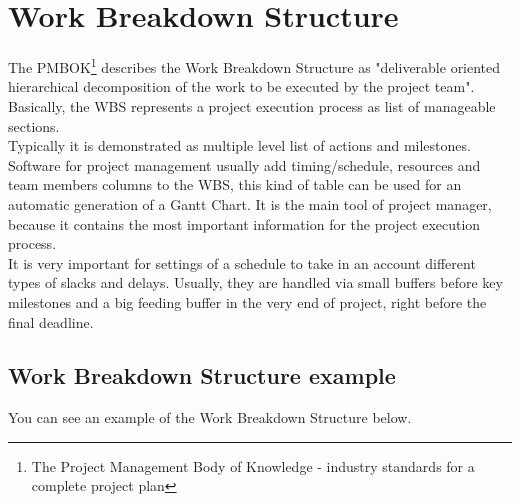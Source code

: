 \documentclass[english]{article}
\begin{document}
\section{Work Breakdown Structure}

The PMBOK\footnote{The Project Management Body of Knowledge - industry standards for a complete project plan} describes the Work Breakdown Structure as "deliverable oriented hierarchical decomposition of the work to be executed by the project team". Basically, the WBS represents a project execution process as list of manageable sections.\\

Typically it is demonstrated as multiple level list of actions and milestones. Software for project management usually add timing/schedule, resources and team members columns to the WBS, this kind of table can be used for an automatic generation of a Gantt Chart. It is the main tool of project manager, because it contains the most important information for the project execution process.\cite{ms}\\

It is very important for settings of a schedule to take in an account different types of slacks and delays. Usually, they are handled via small buffers before key milestones and a big feeding buffer in the very end of project, right before the final deadline.

\subsection{Work Breakdown Structure example}

You can see an example of the Work Breakdown Structure below.
\end{document}

